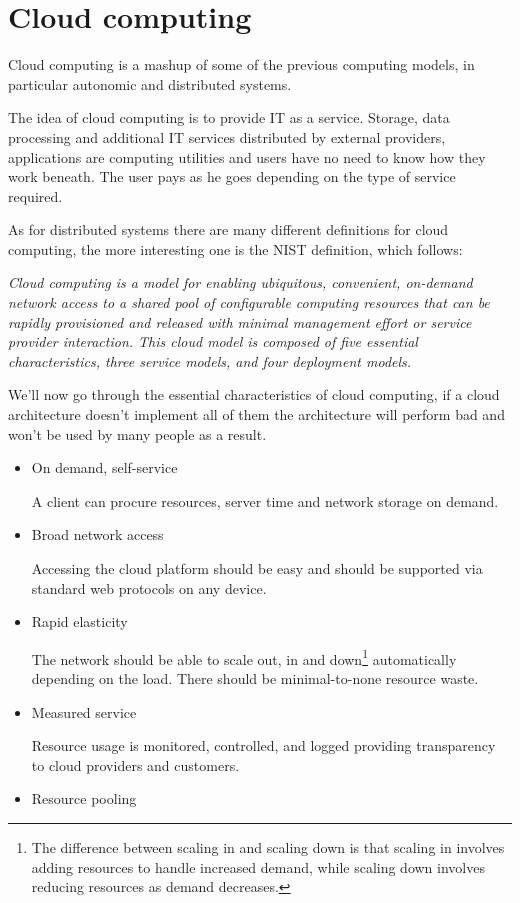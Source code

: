 \section{Cloud computing}
Cloud computing is a mashup of some of the previous computing models, in particular autonomic and distributed systems.

The idea of cloud computing is to provide IT as a service. Storage, data processing and additional IT services distributed by external providers, applications are computing utilities and users have no need to know how they work beneath. The user pays as he goes depending on the type of service required.

As for distributed systems there are many different definitions for cloud computing, the more interesting one is the NIST definition, which follows:
\begin{center}
    \textit{Cloud computing is a model for enabling ubiquitous, convenient, on-demand network access to a shared pool of configurable computing resources that can be rapidly provisioned and released with minimal management effort or service provider interaction. This cloud model is composed of five essential characteristics, three service models, and four deployment models.}
\end{center}
We'll now go through the essential characteristics of cloud computing, if a cloud architecture doesn't implement all of them the architecture will perform bad and won't be used by many people as a result.
\begin{itemize}
    \item On demand, self-service

    A client can procure resources, server time and network storage on demand.
    \item Broad network access

    Accessing the cloud platform should be easy and should be supported via standard web protocols on any device.
    \item Rapid elasticity

    The network should be able to scale out, in and down\footnote{
        The difference between scaling in and scaling down is that scaling in involves adding resources to handle increased demand, while scaling down involves reducing resources as demand decreases.
    } automatically depending on the load. There should be minimal-to-none resource waste.
    \item Measured service

    Resource usage is monitored, controlled, and logged providing transparency to cloud providers and customers.
    \item Resource pooling
\end{itemize}

